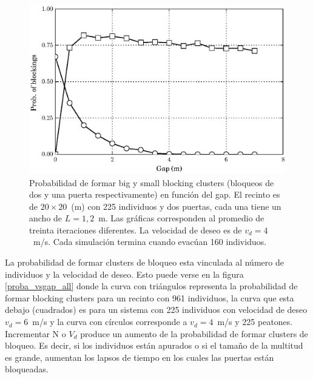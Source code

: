 \begin{figure}[H]
    \centering
    \includegraphics[scale=0.8]{figuras/proba_vsgap_v4_big_small.eps}
    \caption[width=5cm]{Probabilidad de formar big y small blocking clusters (bloqueos de dos y una puerta respectivamente) en función del gap. El recinto es de $20\times 20$~(m) con 225 individuos y dos puertas, cada una tiene un ancho de $L=1,2$~m. Las gráficas corresponden al promedio de treinta iteraciones diferentes. La velocidad de deseo es de $v_d=4$~m/s. Cada simulación termina cuando evacúan 160 individuos.}
    \label{proba_vsgap_v4_big_small}
\end{figure}

La probabilidad de formar clusters de bloqueo esta vinculada al número de individuos y la velocidad de deseo. Esto puede verse en la figura \ref{proba_vsgap_all} donde la curva con triángulos representa la probabilidad de formar blocking clusters para un recinto con 961 individuos, la curva que esta debajo (cuadrados) es para un sistema con 225 individuos con velocidad de deseo $v_d=6$~m/s y la curva con círculos corresponde a $v_d=4$~m/s y 225 peatones. Incrementar N o $V_d$ produce un aumento de la probabilidad de formar clusters de bloqueo. Es decir, si los individuos están apurados o si el tamaño de la multitud es grande, aumentan los lapsos de tiempo en los cuales las puertas están bloqueadas.  

